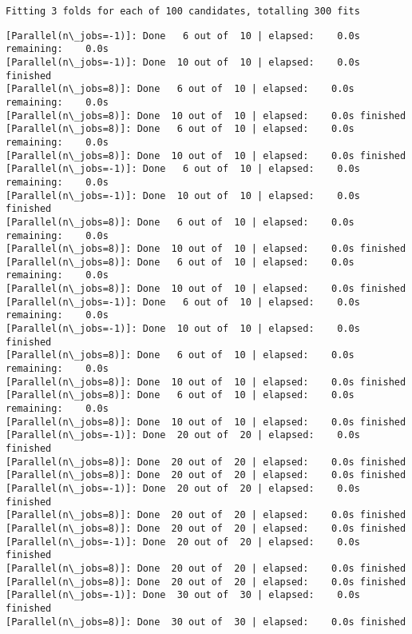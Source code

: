 \documentclass[11pt]{article}
\begin{document}
    \begin{Verbatim}[commandchars=\\\{\}]
Fitting 3 folds for each of 100 candidates, totalling 300 fits

    \end{Verbatim}

    \begin{Verbatim}[commandchars=\\\{\}]
[Parallel(n\_jobs=-1)]: Done   6 out of  10 | elapsed:    0.0s remaining:    0.0s
[Parallel(n\_jobs=-1)]: Done  10 out of  10 | elapsed:    0.0s finished
[Parallel(n\_jobs=8)]: Done   6 out of  10 | elapsed:    0.0s remaining:    0.0s
[Parallel(n\_jobs=8)]: Done  10 out of  10 | elapsed:    0.0s finished
[Parallel(n\_jobs=8)]: Done   6 out of  10 | elapsed:    0.0s remaining:    0.0s
[Parallel(n\_jobs=8)]: Done  10 out of  10 | elapsed:    0.0s finished
[Parallel(n\_jobs=-1)]: Done   6 out of  10 | elapsed:    0.0s remaining:    0.0s
[Parallel(n\_jobs=-1)]: Done  10 out of  10 | elapsed:    0.0s finished
[Parallel(n\_jobs=8)]: Done   6 out of  10 | elapsed:    0.0s remaining:    0.0s
[Parallel(n\_jobs=8)]: Done  10 out of  10 | elapsed:    0.0s finished
[Parallel(n\_jobs=8)]: Done   6 out of  10 | elapsed:    0.0s remaining:    0.0s
[Parallel(n\_jobs=8)]: Done  10 out of  10 | elapsed:    0.0s finished
[Parallel(n\_jobs=-1)]: Done   6 out of  10 | elapsed:    0.0s remaining:    0.0s
[Parallel(n\_jobs=-1)]: Done  10 out of  10 | elapsed:    0.0s finished
[Parallel(n\_jobs=8)]: Done   6 out of  10 | elapsed:    0.0s remaining:    0.0s
[Parallel(n\_jobs=8)]: Done  10 out of  10 | elapsed:    0.0s finished
[Parallel(n\_jobs=8)]: Done   6 out of  10 | elapsed:    0.0s remaining:    0.0s
[Parallel(n\_jobs=8)]: Done  10 out of  10 | elapsed:    0.0s finished
[Parallel(n\_jobs=-1)]: Done  20 out of  20 | elapsed:    0.0s finished
[Parallel(n\_jobs=8)]: Done  20 out of  20 | elapsed:    0.0s finished
[Parallel(n\_jobs=8)]: Done  20 out of  20 | elapsed:    0.0s finished
[Parallel(n\_jobs=-1)]: Done  20 out of  20 | elapsed:    0.0s finished
[Parallel(n\_jobs=8)]: Done  20 out of  20 | elapsed:    0.0s finished
[Parallel(n\_jobs=8)]: Done  20 out of  20 | elapsed:    0.0s finished
[Parallel(n\_jobs=-1)]: Done  20 out of  20 | elapsed:    0.0s finished
[Parallel(n\_jobs=8)]: Done  20 out of  20 | elapsed:    0.0s finished
[Parallel(n\_jobs=8)]: Done  20 out of  20 | elapsed:    0.0s finished
[Parallel(n\_jobs=-1)]: Done  30 out of  30 | elapsed:    0.0s finished
[Parallel(n\_jobs=8)]: Done  30 out of  30 | elapsed:    0.0s finished

\end{Verbatim}
\end{document}

